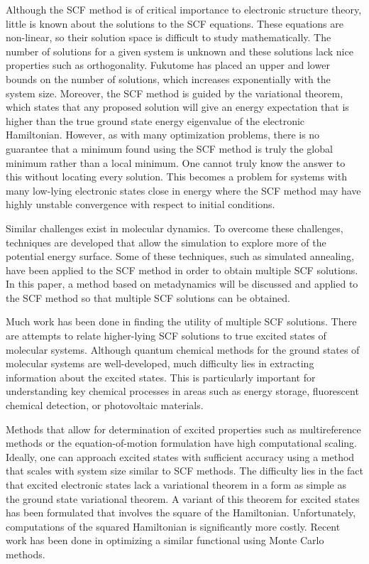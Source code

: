 \documentclass[final,3p,times,twocolumn]{elsarticle}
\begin{document}
Although the SCF method is of critical importance to electronic structure theory, little is known about the solutions to the SCF equations. These equations are non-linear, so their solution space is difficult to study mathematically. The number of solutions for a given system is unknown and these solutions lack nice properties such as orthogonality.\cite{scfmd} Fukutome has placed an upper and lower bounds on the number of solutions, which increases exponentially with the system size.\cite{fukutome-1971} Moreover, the SCF method is guided by the variational theorem, which states that any proposed solution will give an energy expectation that is higher than the true ground state energy eigenvalue of the electronic Hamiltonian. However, as with many optimization problems, there is no guarantee that a minimum found using the SCF method is truly the global minimum rather than a local minimum. One cannot truly know the answer to this without locating every solution. This becomes a problem for systems with many low-lying electronic states close in energy where the SCF method may have highly unstable convergence with respect to initial conditions.

Similar challenges exist in molecular dynamics. To overcome these challenges, techniques are developed that allow the simulation to explore more of the potential energy surface. Some of these techniques, such as simulated annealing, have been applied to the SCF method in order to obtain multiple SCF solutions.\cite{malbouisson-2005} In this paper, a method based on metadynamics\cite{parrinello-2002} will be discussed and applied\cite{scfmd} to the SCF method so that multiple SCF solutions can be obtained.

Much work has been done in finding the utility of multiple SCF solutions. There are attempts to relate higher-lying SCF solutions to true excited states of molecular systems. Although quantum chemical methods for the ground states of molecular systems are well-developed, much difficulty lies in extracting information about the excited states. This is particularly important for understanding key chemical processes in areas such as energy storage,\cite{es-ex1,es-ex2} fluorescent chemical detection,\cite{es-ex3} or photovoltaic materials.\cite{es-ex4,es-ex5}

Methods that allow for determination of excited properties such as multireference methods\cite{shavitt} or the equation-of-motion formulation\cite{eomcc} have high computational scaling. Ideally, one can approach excited states with sufficient accuracy using a method that scales with system size similar to SCF methods. The difficulty lies in the fact that excited electronic states lack a variational theorem in a form as simple as the ground state variational theorem. A variant of this theorem for excited states has been formulated that involves the square of the Hamiltonian.\cite{messmer-1969,brett-1972,murakhtanov-1982} Unfortunately, computations of the squared Hamiltonian is significantly more costly. Recent work has been done in optimizing a similar functional using Monte Carlo methods.\cite{zhao-2016-1,zhao-2016-2}
\end{document}
